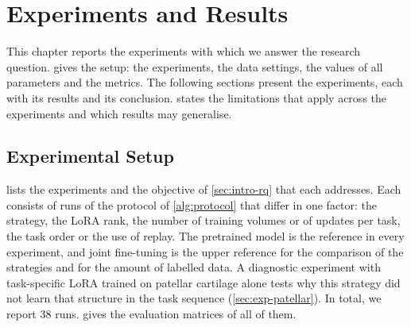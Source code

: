 %

\chapter{Experiments and Results}
\label{chap:experiments}

This chapter reports the experiments with which we answer the research question.
 gives the setup: the experiments, the data settings, the values of all parameters and the metrics.
The following sections present the experiments, each with its results and its conclusion.
 states the limitations that apply across the experiments and which results may generalise.

\section{Experimental Setup}
\label{sec:exp-setup}

 lists the experiments and the objective of \cref{sec:intro-rq} that each addresses.
Each consists of runs of the protocol of \cref{alg:protocol} that differ in one factor: the strategy, the LoRA rank, the number of training volumes or of updates per task, the task order or the use of replay.
The pretrained model is the reference in every experiment, and joint fine-tuning is the upper reference for the comparison of the strategies and for the amount of labelled data.
A diagnostic experiment with task-specific LoRA trained on patellar cartilage alone tests why this strategy did not learn that structure in the task sequence (\cref{sec:exp-patellar}).
In total, we report 38 runs.
 gives the evaluation matrices of all of them.


